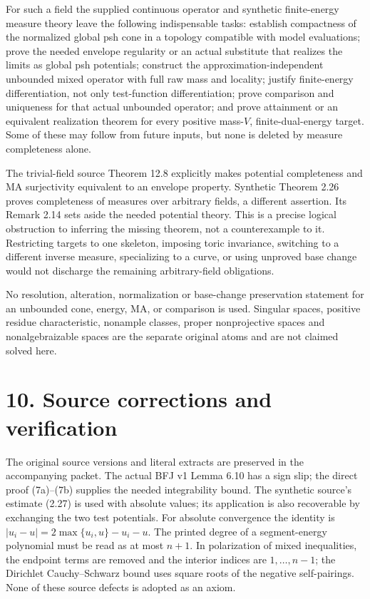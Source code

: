 \documentclass[11pt]{article}
\begin{document}
For such a field the supplied continuous operator and synthetic finite-energy measure theory leave the following indispensable tasks: establish compactness of the normalized global psh cone in a topology compatible with model evaluations; prove the needed envelope regularity or an actual substitute that realizes the limits as global psh potentials; construct the approximation-independent unbounded mixed operator with full raw mass and locality; justify finite-energy differentiation, not only test-function differentiation; prove comparison and uniqueness for that actual unbounded operator; and prove attainment or an equivalent realization theorem for every positive mass-\(V\), finite-dual-energy target. Some of these may follow from future inputs, but none is deleted by measure completeness alone.

The trivial-field source Theorem 12.8 explicitly makes potential completeness and MA surjectivity equivalent to an envelope property. Synthetic Theorem 2.26 proves completeness of measures over arbitrary fields, a different assertion. Its Remark 2.14 sets aside the needed potential theory. This is a precise logical obstruction to inferring the missing theorem, not a counterexample to it. Restricting targets to one skeleton, imposing toric invariance, switching to a different inverse measure, specializing to a curve, or using unproved base change would not discharge the remaining arbitrary-field obligations.

No resolution, alteration, normalization or base-change preservation statement for an unbounded cone, energy, MA, or comparison is used. Singular spaces, positive residue characteristic, nonample classes, proper nonprojective spaces and nonalgebraizable spaces are the separate original atoms and are not claimed solved here.

\section*{10. Source corrections and verification}

The original source versions and literal extracts are preserved in the
accompanying packet. The actual BFJ v1 Lemma 6.10 has a sign slip; the
direct proof (7a)--(7b) supplies the needed integrability bound. The
synthetic source's estimate (2.27) is used with absolute values; its
application is also recoverable by exchanging the two test potentials.
For absolute convergence the identity is
\( |u_i-u|=2\max\{u_i,u\}-u_i-u \).
The printed degree of a segment-energy polynomial must be read as at
most \(n+1\). In polarization of mixed inequalities, the endpoint terms
are removed and the interior indices are \(1,\ldots,n-1\); the
Dirichlet Cauchy--Schwarz bound uses square roots of the negative
self-pairings. None of these source defects is adopted as an axiom.
\end{document}
